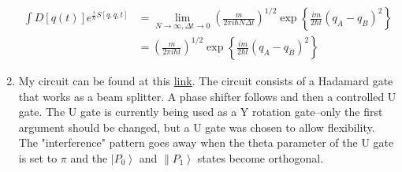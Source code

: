 \documentclass[12pt,a4]{article}
\begin{document}
\begin{enumerate}
\begin{align*}
      \int D[q(t)] e^{\frac{i}{\hbar} S[q, \dot q, t]} &=\lim_{N \to \infty, \Delta t \to 0}\left(\frac{m}{2 \pi i \hbar N \Delta t}\right)^{1 / 2}  \exp\left\{\frac{im}{2 \hbar  t}\left(q_{A} - q_{B}\right)^2\right\}\\
                                                       &=\left(\frac{m}{2 \pi i \hbar t}\right)^{1 / 2}  \exp\left\{\frac{im}{2 \hbar  t}\left(q_{A} - q_{B}\right)^2\right\}
    \end{align*}
  \item
    My circuit can be found at this \href{https://quantum-computing.ibm.com/composer/files/new?initial=N4IgdghgtgpiBcIBSAZA4gewK4HcDOAtAAoDKAkgEwAMFAzCADQgCOEeUCIA8kQKIByARQCCJALIACCgDoqAbgA6YAJZgAxgBssAExgSFLGBuUAjAIzTVag4rBLmAJxgBzCcwDaFALq21T12ruACw\%2BSgAWbu5UoWAADgAUscoSAPQStACUkdG\%2BWInJabQMEgRJxWUSVFke0cUeZjERNTGwbFhO2V4lAHwSgTlKjCC6eH7KsQAuyhhgnCAAvkA}{link}.
    The circuit consists of a Hadamard gate that works as a beam splitter.
    A phase shifter follows and then a controlled U gate.
    The U gate is currently being used as a Y rotation gate--only the first argument should be changed, but a U gate was chosen to allow flexibility.
    The "interference" pattern goes away when the theta parameter of the U gate is set to $\pi$ and the $\left|P_0 \right\rangle$ and $\left\|P_1 \right\rangle$ states become orthogonal.
\end{enumerate}
\end{document}
